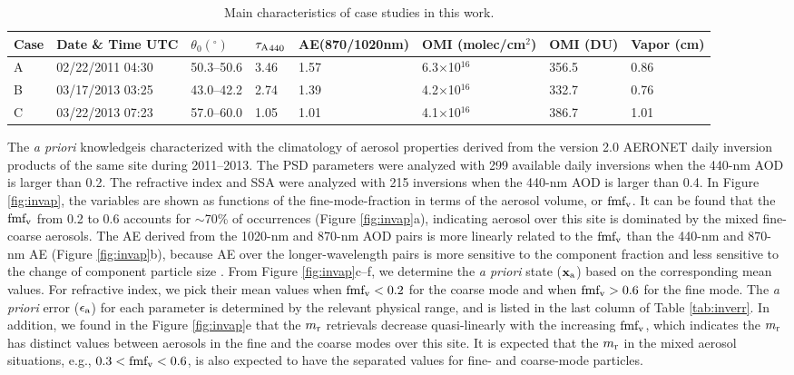 \begin{table}[b]
  \centering
  \small
  \caption{Main characteristics of case studies in this work.}
  \label{tab:invcase}
  \begin{tabular}{p{2em} C{7em}  C{4em} C{2em} C{5em} C{4em} C{4em} C{2em}}
  \toprule
  Case  & Date \& Time \newline UTC& $\theta_0(^\circ)$ & ${\tau_\text{A}}_{440}$ &
  AE\newline(870/1020nm)& OMI  \newline(molec/cm$^2$) & 
  OMI  \newline (DU) & Vapor \newline (cm) \\
  \midrule
   A & 02/22/2011 04:30	& 50.3--50.6 & 3.46 & 1.57 & 6.3$\times$10$^{16}$ & 356.5 & 0.86\\
   B & 03/17/2013 03:25 & 43.0--42.2 & 2.74 & 1.39 & 4.2$\times$10$^{16}$ & 332.7 & 0.76\\
   C & 03/22/2013 07:23 & 57.0--60.0 & 1.05 & 1.01 & 4.1$\times$10$^{16}$ & 386.7 & 1.01\\
  \bottomrule
  \end{tabular}
\end{table}

The \textit{a priori} knowledgeis characterized 
with the climatology of aerosol properties
derived from the version 2.0 AERONET daily inversion products of the same site
during 2011--2013. The PSD parameters were analyzed with 299 available daily
inversions when the 440-nm AOD is larger than 0.2. The refractive index and SSA
were analyzed with 215 inversions when the 440-nm AOD is larger than 0.4. In
Figure \ref{fig:invap}, the variables are shown as functions of the 
fine-mode-fraction in terms of the aerosol volume, or $\text{fmf}_\text{v}$. It can be found 
that the $\text{fmf}_\text{v}$ from 0.2 to 0.6 accounts for $\sim$70\% of occurrences (Figure
\ref{fig:invap}a), indicating aerosol over this site is dominated by the mixed 
fine-coarse aerosols. The AE derived from the 1020-nm and 870-nm AOD pairs is 
more linearly related to the $\text{fmf}_\text{v}$ than the 440-nm and 870-nm AE (Figure
\ref{fig:invap}b), because AE over the longer-wavelength pairs is more
sensitive to the component fraction and less sensitive to the change of
component particle size \citep{Schuster06}. From Figure \ref{fig:invap}c--f, 
we determine the \textit{a priori} state ($\mathbf{x}_\text{a}$) based on the corresponding mean values. 
For refractive index, we pick their mean values when $\text{fmf}_\text{v}<0.2$ for the coarse
mode and when $\text{fmf}_\text{v}>0.6$ for the fine mode. The \textit{a priori} error 
($\epsilon_\text{a}$) for each parameter is determined by the relevant physical 
range, and is listed in the last column of Table \ref{tab:inverr}. 
In addition, we found in the Figure \ref{fig:invap}e that the $m_\text{r}$ 
retrievals decrease quasi-linearly with the increasing $\text{fmf}_\text{v}$, which indicates
the $m_\text{r}$ has distinct values between aerosols in the fine and the coarse
modes over this site. It is expected that the $m_\text{r}$ in the mixed aerosol
situations, e.g., $0.3<\text{fmf}_\text{v}<0.6$, is also expected to have the separated 
values for fine- and coarse-mode particles.


